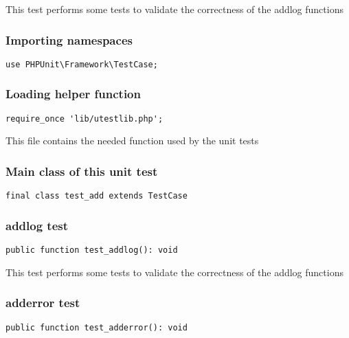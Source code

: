 \documentclass[a4paper]{article}
\begin{document}
This test performs some tests to validate the correctness
of the addlog functions

\hypertarget{toc20}{}
\subsubsection{Importing namespaces}

\begin{lstlisting}
use PHPUnit\Framework\TestCase;
\end{lstlisting}

\hypertarget{toc21}{}
\subsubsection{Loading helper function}

\begin{lstlisting}
require_once 'lib/utestlib.php';
\end{lstlisting}

This file contains the needed function used by the unit tests

\hypertarget{toc22}{}
\subsubsection{Main class of this unit test}

\begin{lstlisting}
final class test_add extends TestCase
\end{lstlisting}

\hypertarget{toc23}{}
\subsubsection{addlog test}

\begin{lstlisting}
public function test_addlog(): void
\end{lstlisting}

This test performs some tests to validate the correctness
of the addlog functions

\hypertarget{toc24}{}
\subsubsection{adderror test}

\begin{lstlisting}
public function test_adderror(): void
\end{lstlisting}
\end{document}
